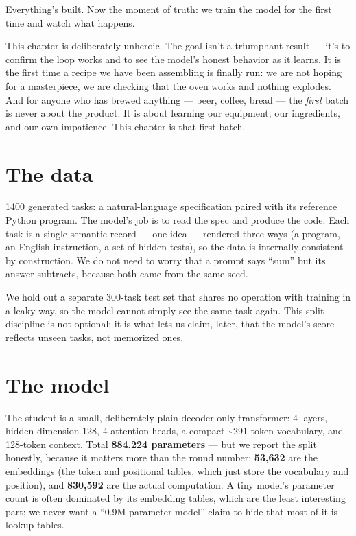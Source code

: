 Everything's built. Now the moment of truth: we train the model for the
first time and watch what happens.

This chapter is deliberately unheroic. The goal isn't a triumphant
result --- it's to confirm the loop works and to see the model's honest
behavior as it learns. It is the first time a recipe we have been
assembling is finally run: we are not hoping for a masterpiece, we are
checking that the oven works and nothing explodes. And for anyone who
has brewed anything --- beer, coffee, bread --- the \emph{first} batch
is never about the product. It is about learning our equipment, our
ingredients, and our own impatience. This chapter is that first batch.

\section{The data}\label{the-data}

1400 generated tasks: a natural-language specification paired with its
reference Python program. The model's job is to read the spec and
produce the code. Each task is a single semantic record --- one idea ---
rendered three ways (a program, an English instruction, a set of hidden
tests), so the data is internally consistent by construction. We do not
need to worry that a prompt says ``sum'' but its answer subtracts,
because both came from the same seed.

We hold out a separate 300-task test set that shares no operation with
training in a leaky way, so the model cannot simply see the same task
again. This split discipline is not optional: it is what lets us claim,
later, that the model's score reflects unseen tasks, not memorized ones.

\section{The model}\label{the-model}

The student is a small, deliberately plain decoder-only transformer: 4
layers, hidden dimension 128, 4 attention heads, a compact
\textasciitilde291-token vocabulary, and 128-token context. Total
\textbf{884,224 parameters} --- but we report the split honestly,
because it matters more than the round number: \textbf{53,632} are the
embeddings (the token and positional tables, which just store the
vocabulary and position), and \textbf{830,592} are the actual
computation. A tiny model's parameter count is often dominated by its
embedding tables, which are the least interesting part; we never want a
``0.9M parameter model'' claim to hide that most of it is lookup tables.

